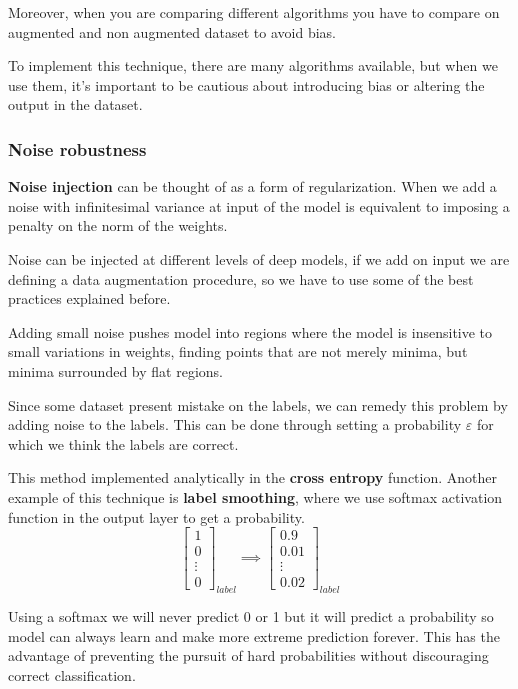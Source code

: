 Moreover, when you are comparing different algorithms you have to compare on
augmented and non augmented dataset to avoid bias.

To implement this technique, there are many algorithms available, but when we
use them, it's important to be cautious about introducing bias or altering the
output in the dataset.
\subsubsection{Noise robustness}
\textbf{Noise injection} can be thought of as a form of regularization. When we
add a noise with infinitesimal variance at input of the model is equivalent to
imposing a penalty on the norm of the weights.

Noise can be injected at different levels of deep models, if we add on input we
are defining a data augmentation procedure, so we have to use some of the best
practices explained before.

Adding small noise pushes model into regions where the model is insensitive to
small variations in weights, finding points that are not merely minima, but
minima surrounded by flat regions.

Since some dataset present mistake on the labels, we can remedy this problem by
adding noise to the labels. This can be done through setting a probability $\varepsilon$
for which we think the labels are correct.

This method implemented analytically in the \textbf{cross entropy} function.
Another example of this technique is \textbf{label smoothing}, where we use
softmax activation function in the output layer to get a probability.
\begin{equation*}
    \left[\begin{array}{c}
            1 \\0\\\vdots\\ 0
        \end{array}\right]_{label} \implies \left[\begin{array}{c}
            0.9 \\0.01\\\vdots\\ 0.02
        \end{array}\right]_{label}
\end{equation*}

Using a softmax we will never predict 0 or 1 but it will predict a probability so
model can always learn and make more extreme prediction forever. This has the
advantage of preventing the pursuit of hard probabilities without discouraging
correct classification.
